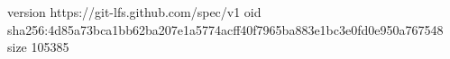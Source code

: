 version https://git-lfs.github.com/spec/v1
oid sha256:4d85a73bca1bb62ba207e1a5774acff40f7965ba883e1bc3e0fd0e950a767548
size 105385
